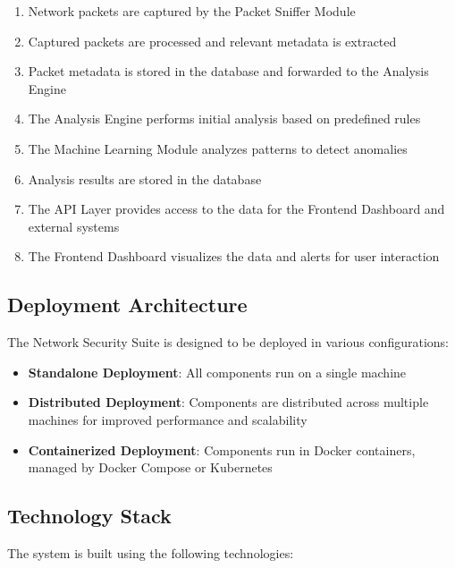 \begin{enumerate}
    \item Network packets are captured by the Packet Sniffer Module
    \item Captured packets are processed and relevant metadata is extracted
    \item Packet metadata is stored in the database and forwarded to the Analysis Engine
    \item The Analysis Engine performs initial analysis based on predefined rules
    \item The Machine Learning Module analyzes patterns to detect anomalies
    \item Analysis results are stored in the database
    \item The API Layer provides access to the data for the Frontend Dashboard and external systems
    \item The Frontend Dashboard visualizes the data and alerts for user interaction
\end{enumerate}

\subsection{Deployment Architecture}
The Network Security Suite is designed to be deployed in various configurations:

\begin{itemize}
    \item \textbf{Standalone Deployment}: All components run on a single machine
    \item \textbf{Distributed Deployment}: Components are distributed across multiple machines for improved performance and scalability
    \item \textbf{Containerized Deployment}: Components run in Docker containers, managed by Docker Compose or Kubernetes
\end{itemize}

\subsection{Technology Stack}
The system is built using the following technologies:

